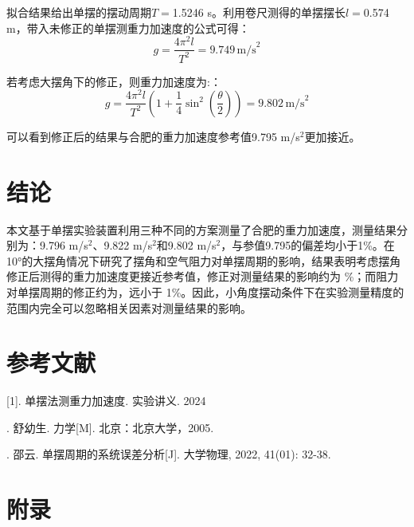 \documentclass[a4paper]{extarticle}
\begin{document}
    \par\hspace{2em}
    拟合结果给出单摆的摆动周期$T=$1.5246 s。利用卷尺测得的单摆摆长$l=$0.574 m，带入未修正的单摆测重力加速度的公式可得：
    \begin{equation*}
        g=\frac{4\pi^2l}{T^2}=9.749\,\text{m/s}^2
    \end{equation*}
    \par\hspace{2em}
    若考虑大摆角下的修正，则重力加速度为:：
    \begin{equation*}
        g=\frac{4\pi^2l}{T^2}\left(1+\frac{1}{4}\sin^2\left(\frac{\theta}{2}\right)\right)=9.802\,\text{m/s}^2
    \end{equation*}
    \par\hspace{2em}
    可以看到修正后的结果与合肥的重力加速度参考值9.795 m/s$^2$更加接近。
    \section{结论}
    \hspace{2em}
    本文基于单摆实验装置利用三种不同的方案测量了合肥的重力加速度，测量结果分别为：9.796 m/s$^2$、9.822 m/s$^2$和9.802 m/s$^2$，与参值9.795的偏差均小于1\%。在 10°的大摆角情况下研究了摆角和空气阻力对单摆周期的影响，结果表明考虑摆角修正后测得的重力加速度更接近参考值，修正对测量结果的影响约为 \%；而阻力对单摆周期的修正约为，远小于 1\%。因此，小角度摆动条件下在实验测量精度的范围内完全可以忽略相关因素对测量结果的影响。
    \section*{参考文献}
    [1]. 单摆法测重力加速度. 实验讲义. 2024
    \par
    [2]. 舒幼生. 力学[M]. 北京：北京大学，2005.
    \par
    [3]. 邵云. 单摆周期的系统误差分析[J]. 大学物理, 2022, 41(01): 32-38.
    \newpage
    \section*{附录}
\end{document}
